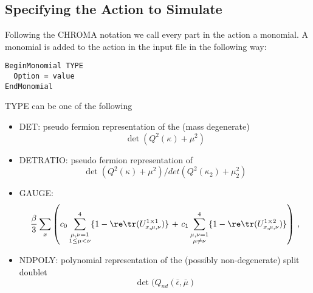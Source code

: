 \subsection{Specifying the Action to Simulate}

Following the CHROMA notation we call every part in the action a
monomial. A monomial is added to the action in the input file in the
following way:
\begin{verbatim}
BeginMonomial TYPE
  Option = value
EndMonomial
\end{verbatim}
{\ttfamily TYPE} can be one of the following
\begin{itemize}
\item {\ttfamily DET}: pseudo fermion representation of the (mass degenerate)\\
  \[
  \det(Q^2(\kappa) + \mu^2)
  \]
\item {\ttfamily DETRATIO}: pseudo fermion representation of\\
  \[
  \det(Q^2(\kappa) + \mu^2)/det(Q^2(\kappa_2) + \mu_2^2)
  \]
\item {\ttfamily GAUGE}:\\
  \[
  \frac{\beta}{3}\sum_x\left(  c_0\sum_{\substack{
        \mu,\nu=1\\1\leq\mu<\nu}}^4\{1-\re\tr(U^{1\times1}_{x,\mu,\nu})\}\Bigr. 
    \Bigl.\ +\ 
    c_1\sum_{\substack{\mu,\nu=1\\\mu\neq\nu}}^4\{1
    -\re\tr(U^{1\times2}_{x,\mu,\nu})\}\right)\,  ,
  \]
\item {\ttfamily NDPOLY}: polynomial representation of the (possibly
  non-degenerate) split doublet\\
  \[
  \det(Q_{nd}(\bar\epsilon, \bar\mu)
  \]
\end{itemize}

